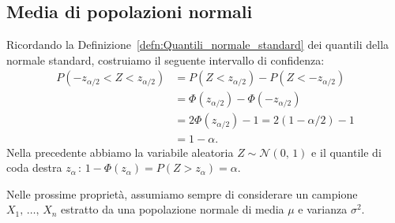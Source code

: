         \subsection{Media di popolazioni normali}
            \begin{defn}
                Ricordando la Definizione~\ref{defn:Quantili_normale_standard} dei quantili della normale 
                standard, costruiamo il seguente intervallo di confidenza:
                \begin{align*}
                    P(-z_{\alpha /2} < Z < z_{\alpha /2}) &= 
                    P(Z < z_{\alpha /2}) - P(Z < -z_{\alpha /2}) \\
                    &= \Phi(z_{\alpha /2}) - \Phi(-z_{\alpha /2}) \\
                    &= 2\Phi(z_{\alpha /2}) -1 = 2(1-\alpha /2) -1 \\
                    &= 1-\alpha
                .\end{align*}
                Nella precedente abbiamo la variabile aleatoria $Z \sim \mathcal{N}(0,\,1)$ e il quantile di 
                coda destra $z_{\alpha} \,:\, 1-\Phi(z_{\alpha}) = P(Z > z_{\alpha}) = \alpha$.
            \end{defn}
            \begin{note}
                Nelle prossime proprietà, assumiamo sempre di considerare un campione $X_1,\, \ldots,\, X_{n}$ 
                estratto da una popolazione normale di media $\mu$ e varianza $\sigma^2$.
            \end{note}

